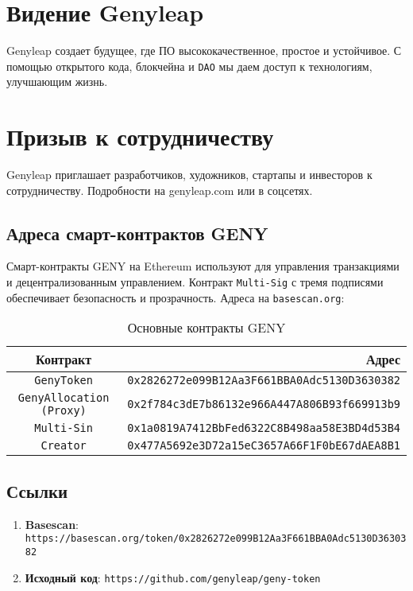 \documentclass[a4paper,12pt,openany]{book}
\begin{document}
\chapter{Видение Genyleap}
Genyleap создает будущее, где ПО высококачественное, простое и устойчивое. С помощью открытого кода, блокчейна и \texttt{DAO} мы даем доступ к технологиям, улучшающим жизнь.

\chapter{Призыв к сотрудничеству}
Genyleap приглашает разработчиков, художников, стартапы и инвесторов к сотрудничеству. Подробности на genyleap.com или в соцсетях.

\section*{Адреса смарт-контрактов GENY}
Смарт-контракты GENY на Ethereum используют  для управления транзакциями и децентрализованным управлением. Контракт \texttt{Multi-Sig} с тремя подписями обеспечивает безопасность и прозрачность. Адреса на \texttt{basescan.org}:

\begin{table}[h]
\centering
\caption*{Основные контракты GENY}
\small
\begin{tabular}{c r}
\hline
\textbf{Контракт} & \textbf{Адрес} \\
\hline
\texttt{GenyToken} & {\texttt{0x2826272e099B12Aa3F661BBA0Adc5130D3630382}} \\
\texttt{GenyAllocation (Proxy)} & {\texttt{0x2f784c3dE7b86132e966A447A806B93f669913b9}} \\
\texttt{Multi-Sin} & {\texttt{0x1a0819A7412BbFed6322C8B498aa58E3BD4d53B4}} \\
\texttt{Creator} & {\texttt{0x477A5692e3D72a15eC3657A66F1F0bE67dAEA8B1}} \\
\hline
\end{tabular}
\end{table}

\section*{Ссылки}

\begin{enumerate}
    \item \textbf{Basescan}: \texttt{https://basescan.org/token/0x2826272e099B12Aa3F661BBA0Adc5130D3630382}
    \item \textbf{Исходный код}: \texttt{https://github.com/genyleap/geny-token}
\end{enumerate}
\end{document}
